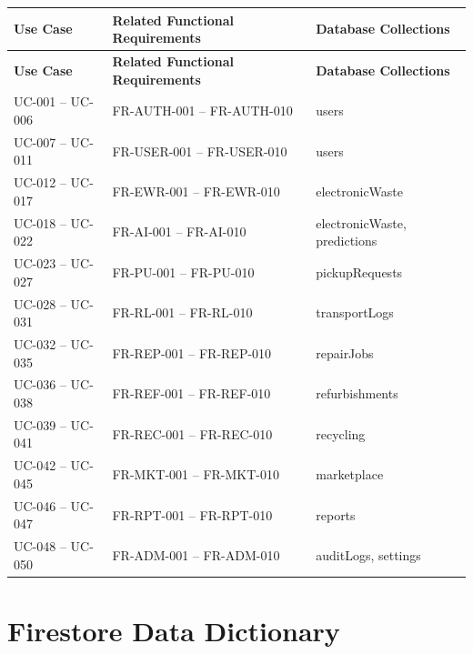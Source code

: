 \begin{longtable}{|p{2.5cm}|p{5cm}|p{5cm}|}

\hline
\textbf{Use Case} &
\textbf{Related Functional Requirements} &
\textbf{Database Collections} \\
\hline
\endfirsthead

\hline
\textbf{Use Case} &
\textbf{Related Functional Requirements} &
\textbf{Database Collections} \\
\hline
\endhead

UC-001 -- UC-006 &
FR-AUTH-001 -- FR-AUTH-010 &
users \\
\hline

UC-007 -- UC-011 &
FR-USER-001 -- FR-USER-010 &
users \\
\hline

UC-012 -- UC-017 &
FR-EWR-001 -- FR-EWR-010 &
electronicWaste \\
\hline

UC-018 -- UC-022 &
FR-AI-001 -- FR-AI-010 &
electronicWaste, predictions \\
\hline

UC-023 -- UC-027 &
FR-PU-001 -- FR-PU-010 &
pickupRequests \\
\hline

UC-028 -- UC-031 &
FR-RL-001 -- FR-RL-010 &
transportLogs \\
\hline

UC-032 -- UC-035 &
FR-REP-001 -- FR-REP-010 &
repairJobs \\
\hline

UC-036 -- UC-038 &
FR-REF-001 -- FR-REF-010 &
refurbishments \\
\hline

UC-039 -- UC-041 &
FR-REC-001 -- FR-REC-010 &
recycling \\
\hline

UC-042 -- UC-045 &
FR-MKT-001 -- FR-MKT-010 &
marketplace \\
\hline

UC-046 -- UC-047 &
FR-RPT-001 -- FR-RPT-010 &
reports \\
\hline

UC-048 -- UC-050 &
FR-ADM-001 -- FR-ADM-010 &
auditLogs, settings \\
\hline

\end{longtable}

\section{Firestore Data Dictionary}
\label{sec:data-dictionary}

